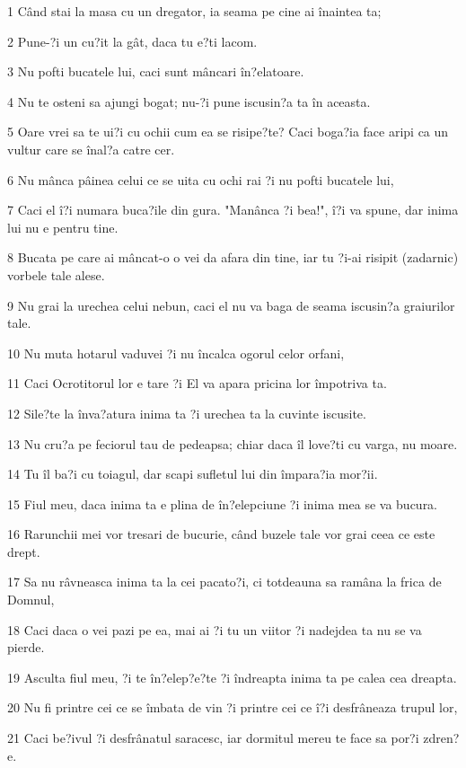 \par 1 Când stai la masa cu un dregator, ia seama pe cine ai înaintea ta;
\par 2 Pune-?i un cu?it la gât, daca tu e?ti lacom.
\par 3 Nu pofti bucatele lui, caci sunt mâncari în?elatoare.
\par 4 Nu te osteni sa ajungi bogat; nu-?i pune iscusin?a ta în aceasta.
\par 5 Oare vrei sa te ui?i cu ochii cum ea se risipe?te? Caci boga?ia face aripi ca un vultur care se înal?a catre cer.
\par 6 Nu mânca pâinea celui ce se uita cu ochi rai ?i nu pofti bucatele lui,
\par 7 Caci el î?i numara buca?ile din gura. "Manânca ?i bea!", î?i va spune, dar inima lui nu e pentru tine.
\par 8 Bucata pe care ai mâncat-o o vei da afara din tine, iar tu ?i-ai risipit (zadarnic) vorbele tale alese.
\par 9 Nu grai la urechea celui nebun, caci el nu va baga de seama iscusin?a graiurilor tale.
\par 10 Nu muta hotarul vaduvei ?i nu încalca ogorul celor orfani,
\par 11 Caci Ocrotitorul lor e tare ?i El va apara pricina lor împotriva ta.
\par 12 Sile?te la înva?atura inima ta ?i urechea ta la cuvinte iscusite.
\par 13 Nu cru?a pe feciorul tau de pedeapsa; chiar daca îl love?ti cu varga, nu moare.
\par 14 Tu îl ba?i cu toiagul, dar scapi sufletul lui din împara?ia mor?ii.
\par 15 Fiul meu, daca inima ta e plina de în?elepciune ?i inima mea se va bucura.
\par 16 Rarunchii mei vor tresari de bucurie, când buzele tale vor grai ceea ce este drept.
\par 17 Sa nu râvneasca inima ta la cei pacato?i, ci totdeauna sa ramâna la frica de Domnul,
\par 18 Caci daca o vei pazi pe ea, mai ai ?i tu un viitor ?i nadejdea ta nu se va pierde.
\par 19 Asculta fiul meu, ?i te în?elep?e?te ?i îndreapta inima ta pe calea cea dreapta.
\par 20 Nu fi printre cei ce se îmbata de vin ?i printre cei ce î?i desfrâneaza trupul lor,
\par 21 Caci be?ivul ?i desfrânatul saracesc, iar dormitul mereu te face sa por?i zdren?e.
